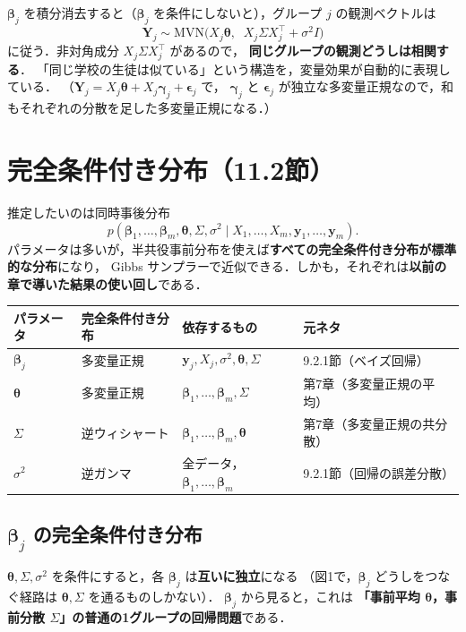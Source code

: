\documentclass[lualatex,ja=standard,a4paper,12pt]{bxjsarticle}
\newcommand{\mvn}{\mathrm{MVN}}
\begin{document}
$\bm{\beta}_j$ を積分消去すると（$\bm{\beta}_j$ を条件にしないと），グループ $j$ の観測ベクトルは
\[
  \bm{Y}_j \sim \mvn\!\bigl(X_j \bm{\theta},\;\; X_j \Sigma X_j^\top + \sigma^2 I\bigr)
\]
に従う．非対角成分 $X_j \Sigma X_j^\top$ があるので，
\textbf{同じグループの観測どうしは相関する}．
「同じ学校の生徒は似ている」という構造を，変量効果が自動的に表現している．
（$\bm{Y}_j = X_j\bm{\theta} + X_j\bm{\gamma}_j + \bm{\epsilon}_j$ で，
$\bm{\gamma}_j$ と $\bm{\epsilon}_j$ が独立な多変量正規なので，和もそれぞれの分散を足した多変量正規になる．）

\section{完全条件付き分布（11.2節）}

推定したいのは同時事後分布
\[
  p(\bm{\beta}_1, \ldots, \bm{\beta}_m, \bm{\theta}, \Sigma, \sigma^2 \mid X_1, \ldots, X_m, \bm{y}_1, \ldots, \bm{y}_m).
\]
パラメータは多いが，半共役事前分布を使えば\textbf{すべての完全条件付き分布が標準的な分布}になり，
Gibbs サンプラーで近似できる．しかも，それぞれは\textbf{以前の章で導いた結果の使い回し}である．

\begin{center}
\small
\renewcommand{\arraystretch}{1.5}
\setlength{\tabcolsep}{4pt}
\begin{tabular}{llll}
\toprule
パラメータ & 完全条件付き分布 & 依存するもの & 元ネタ \\
\midrule
$\bm{\beta}_j$ & 多変量正規 & $\bm{y}_j, X_j, \sigma^2, \bm{\theta}, \Sigma$ & 9.2.1節（ベイズ回帰） \\
$\bm{\theta}$ & 多変量正規 & $\bm{\beta}_1,\ldots,\bm{\beta}_m, \Sigma$ & 第7章（多変量正規の平均） \\
$\Sigma$ & 逆ウィシャート & $\bm{\beta}_1,\ldots,\bm{\beta}_m, \bm{\theta}$ & 第7章（多変量正規の共分散） \\
$\sigma^2$ & 逆ガンマ & 全データ，$\bm{\beta}_1,\ldots,\bm{\beta}_m$ & 9.2.1節（回帰の誤差分散） \\
\bottomrule
\end{tabular}
\end{center}

\subsection{$\bm{\beta}_j$ の完全条件付き分布}

$\bm{\theta}, \Sigma, \sigma^2$ を条件にすると，各 $\bm{\beta}_j$ は\textbf{互いに独立}になる
（図1で，$\bm{\beta}_j$ どうしをつなぐ経路は $\bm{\theta}, \Sigma$ を通るものしかない）．
$\bm{\beta}_j$ から見ると，これは
\textbf{「事前平均 $\bm{\theta}$，事前分散 $\Sigma$」の普通の1グループの回帰問題}である．
\end{document}

